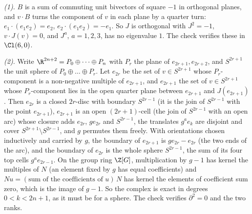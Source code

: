 \emph{(1).} $B$ is a sum of commuting unit bivectors of square $-1$ in orthogonal planes, and $v \cdot B$ turns the component of $v$ in each plane by a quarter turn: $e_{1} \cdot (e_{1}e_{2}) = e_{2}$, $e_{2} \cdot (e_{1}e_{2}) = -e_{1}$. So $J$ is orthogonal with $J^{2} = -1$, $v \cdot J(v) = 0$, and $J^{a}$, $a = 1, 2, 3$, has no eigenvalue $1$. The check verifies these in $\Cl(6,0)$.

\emph{(2).} Write $\R^{2n+2} = P_{0} \oplus \dots \oplus P_{n}$ with $P_{r}$ the plane of $e_{2r+1}, e_{2r+2}$, and $S^{2r+1}$ the unit sphere of $P_{0} \oplus \dots \oplus P_{r}$. Let $e_{2r}$ be the set of $v \in S^{2r+1}$ whose $P_{r}$-component is a non-negative multiple of $e_{2r+1}$, and $e_{2r+1}$ the set of $v \in S^{2r+1}$ whose $P_{r}$-component lies in the open quarter plane between $e_{2r+1}$ and $J(e_{2r+1})$. Then $e_{2r}$ is a closed $2r$-disc with boundary $S^{2r-1}$ (it is the join of $S^{2r-1}$ with the point $e_{2r+1}$), $e_{2r+1}$ is an open $(2r+1)$-cell (the join of $S^{2r-1}$ with an open arc) whose closure adds $e_{2r}$, $g e_{2r}$ and $S^{2r-1}$, the translates $g^{a}e_{k}$ are disjoint and cover $S^{2r+1} \setminus S^{2r-1}$, and $g$ permutes them freely. With orientations chosen inductively and carried by $g$, the boundary of $e_{2r+1}$ is $g e_{2r} - e_{2r}$ (the two ends of the arc), and the boundary of $e_{2r}$ is the whole sphere $S^{2r-1}$, the sum of its four top cells $g^{a}e_{2r-1}$. On the group ring $\Z[G]$, multiplication by $g - 1$ has kernel the multiples of $N$ (an element fixed by $g$ has equal coefficients) and $N u = (\text{sum of the coefficients of } u)\,N$ has kernel the elements of coefficient sum zero, which is the image of $g - 1$. So the complex is exact in degrees $0 < k < 2n+1$, as it must be for a sphere. The check verifies $\partial^{2} = 0$ and the two ranks.

